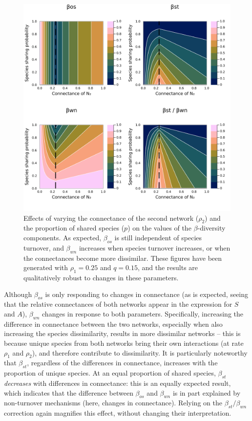 \documentclass[10pt,oneside]{article}
\makeatletter
\def\maxwidth{\ifdim\Gin@nat@width>\linewidth\linewidth
\else\Gin@nat@width\fi}
\let\Oldincludegraphics\includegraphics
\renewcommand{\includegraphics}[1]{\Oldincludegraphics[width=\maxwidth]{#1}}
\makeatother
\begin{document}
\begin{figure}
\hypertarget{fig:numexp3}{%
\centering
\includegraphics{figures/numexp3.png}
\caption{Effects of varying the connectance of the second network
(\(\rho_2\)) and the proportion of shared species (\(p\)) on the values
of the \(\beta\)-diversity components. As expected, \(\beta_{os}\) is
still independent of species turnover, and \(\beta_{wn}\) increases when
species turnover increases, or when the connectances become more
dissimilar. These figures have been generated with \(\rho_1 = 0.25\) and
\(q = 0.15\), and the results are qualitatively robust to changes in
these parameters.}\label{fig:numexp3}
}
\end{figure}

Although \(\beta_{os}\) is only responding to changes in connectance (as
is expected, seeing that the relative connectances of both networks
appear in the expression for \(S\) and \(A\)), \(\beta_{wn}\) changes in
response to both parameters. Specifically, increasing the difference in
connectance between the two networks, especially when also increasing
the species dissimilarity, results in more dissimilar networks -- this
is because unique species from both networks bring their own
interactions (at rate \(\rho_1\) and \(\rho_2\)), and therefore
contribute to dissimilarity. It is particularly noteworthy that
\(\beta_{st}\), regardless of the differences in connectance, increases
with the proportion of unique species. At an equal proportion of shared
species, \(\beta_{st}\) \emph{decreases} with differences in
connectance: this is an equally expected result, which indicates that
the difference between \(\beta_{os}\) and \(\beta_{wn}\) is in part
explained by non-turnover mechanisms (here, changes in connectance).
Relying on the \(\beta_{st}/\beta_{wn}\) correction again magnifies this
effect, without changing their interpretation.
\end{document}
